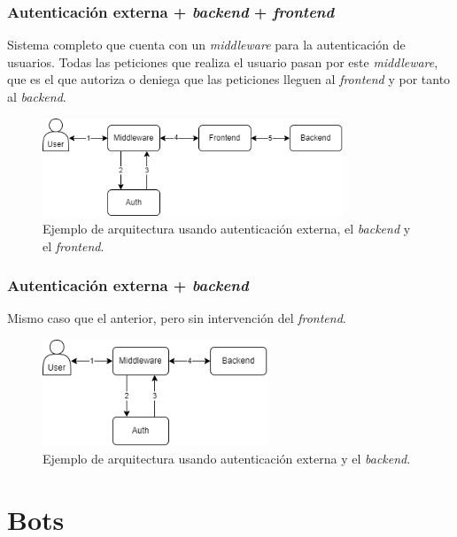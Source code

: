 \subsubsection{Autenticación externa + \textit{backend} + \textit{frontend}}

Sistema completo que cuenta con un \textit{middleware} para la autenticación de usuarios. Todas las peticiones que realiza el usuario pasan por este \textit{middleware}, que es el que autoriza o deniega que las peticiones lleguen al \textit{frontend} y por tanto al \textit{backend}.

\begin{figure}[H]
	\centering
	\includegraphics[width=0.8\textwidth]{img/auth_with_frontend.png}
	\caption{Ejemplo de arquitectura usando autenticación externa, el \textit{backend} y el \textit{frontend}.}
\end{figure}


\subsubsection{Autenticación externa + \textit{backend}}

Mismo caso que el anterior, pero sin intervención del \textit{frontend}.

\begin{figure}[H]
	\centering
	\includegraphics[width=0.6\textwidth]{img/auth_without_frontend.png}
	\caption{Ejemplo de arquitectura usando autenticación externa y el \textit{backend}.}
\end{figure}





\section{Bots}

